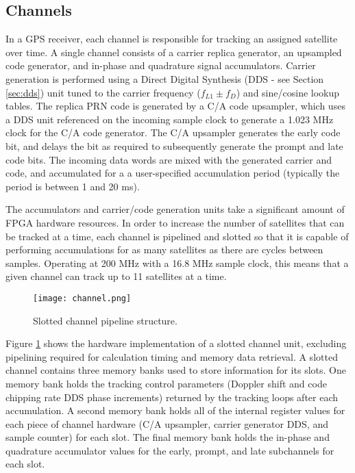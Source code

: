 \documentclass[12pt]{article}
\begin{document}
\subsection{Channels}
In a GPS receiver, each channel is responsible for tracking an assigned satellite over time. A single channel consists of a carrier replica generator, an upsampled code generator, and in-phase and quadrature signal accumulators. Carrier generation is performed using a Direct Digital Synthesis (DDS - see Section \ref{sec:dds}) unit tuned to the carrier frequency ($f_{L1} \pm f_D$) and sine/cosine lookup tables. The replica PRN code is generated by a C/A code upsampler, which uses a DDS unit referenced on the incoming sample clock to generate a 1.023 MHz clock for the C/A code generator. The C/A upsampler generates the early code bit, and delays the bit as required to subsequently generate the prompt and late code bits. The incoming data words are mixed with the generated carrier and code, and accumulated for a a user-specified accumulation period (typically the period is between 1 and 20 ms).

The accumulators and carrier/code generation units take a significant amount of FPGA hardware resources. In order to increase the number of satellites that can be tracked at a time, each channel is pipelined and slotted so that it is capable of performing accumulations for as many satellites as there are cycles between samples. Operating at 200 MHz with a 16.8 MHz sample clock, this means that a given channel can track up to 11 satellites at a time.

\begin{figure}
\centering
\texttt{[image: channel.png]}
\caption{Slotted channel pipeline structure.}
\label{img:slotted channel}
\end{figure}

Figure \ref{img:slotted channel} shows the hardware implementation of a slotted channel unit, excluding pipelining required for calculation timing and memory data retrieval. A slotted channel contains three memory banks used to store information for its slots. One memory bank holds the tracking control parameters (Doppler shift and code chipping rate DDS phase increments) returned by the tracking loops after each accumulation. A second memory bank holds all of the internal register values for each piece of channel hardware (C/A upsampler, carrier generator DDS, and sample counter) for each slot. The final memory bank holds the in-phase and quadrature accumulator values for the early, prompt, and late subchannels for each slot.
\end{document}

